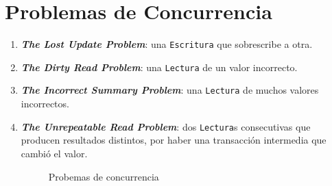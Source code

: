 \documentclass[a4paper, twoside]{article}
\begin{document}
\section{Problemas de Concurrencia}
\begin{enumerate}
\item \textbf{\emph{The Lost Update Problem}}: una \texttt{Escritura} que
sobrescribe a otra.
\item \textbf{\emph{The Dirty Read Problem}}: una \texttt{Lectura} de un
valor incorrecto.
\item \textbf{\emph{The Incorrect Summary Problem}}: una \texttt{Lectura}
de muchos valores incorrectos.
\item \textbf{\emph{The Unrepeatable Read Problem}}: dos \texttt{Lectura}s
consecutivas que producen resultados distintos, por haber una transacción
intermedia que cambió el valor.


\begin{figure}[H]
\noindent \begin{centering}
\par\end{centering}

\noindent \begin{centering}
\par\end{centering}

\noindent \begin{centering}
\par\end{centering}

\protect\caption{Probemas de concurrencia}


\end{figure}


\end{enumerate}
\end{document}
